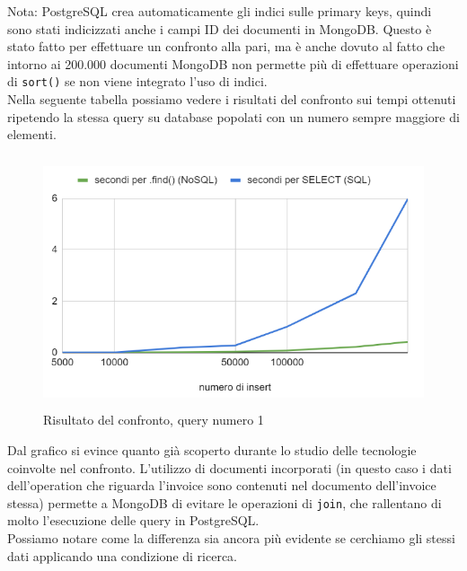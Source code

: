 \noindent Nota: PostgreSQL crea automaticamente gli indici sulle primary keys, quindi sono stati indicizzati anche i campi ID dei documenti in MongoDB. Questo è stato fatto per effettuare un confronto alla pari, ma è anche dovuto al fatto che intorno ai 200.000 documenti MongoDB non permette più di effettuare operazioni di \texttt{sort()} se non viene integrato l'uso di indici.\\

\noindent Nella seguente tabella possiamo vedere i risultati del confronto sui tempi ottenuti ripetendo la stessa query su database popolati con un numero sempre maggiore di elementi.\\

\begin{figure}[htbp]
\begin{center}
\includegraphics[height=20em]{immagini/query/query1_results.png}
\caption{Risultato del confronto, query numero 1}
\end{center}
\end{figure}

\noindent Dal grafico si evince quanto già scoperto durante lo studio delle tecnologie coinvolte nel confronto. L'utilizzo di documenti incorporati (in questo caso i dati dell'operation che riguarda l'invoice sono contenuti nel documento dell'invoice stessa) permette a MongoDB di evitare le operazioni di \texttt{join}, che rallentano di molto l'esecuzione delle query in PostgreSQL.\\

\noindent Possiamo notare come la differenza sia ancora più evidente se cerchiamo gli stessi dati applicando una condizione di ricerca.\\


